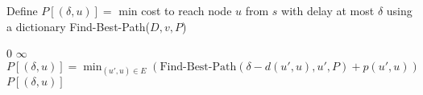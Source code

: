 \begin{questions}
\begin{soln}
		\begin{algorithmic}[1]
			\State Define $P[(\delta, u)] = $ min cost to reach node $u$ from $s$ with delay at most $\delta$ using a dictionary
			\State \Return Find-Best-Path($D, v, P$)
			\EndProcedure
		\end{algorithmic}

		\newpage

		\begin{algorithmic}[1]
			\State \Return $0$
			\EndIf
			\State \Return $\infty$
			\EndIf
			\State $P[(\delta, u)] = \min_{(u', u) \in E}(\text{Find-Best-Path}(\delta - d(u', u), u', P) + p(u', u))$
			\EndIf
			\State \Return $P[(\delta, u)]$
			\EndProcedure
		\end{algorithmic}

	\end{soln}




\end{questions}
